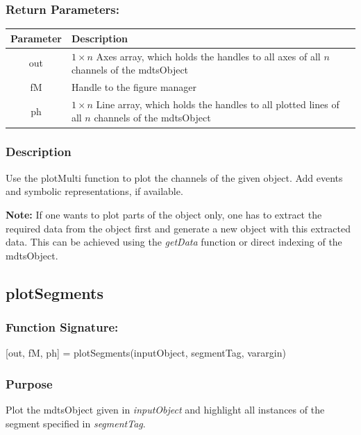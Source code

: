 \documentclass[a4]{scrreprt}
\begin{document}
\subsubsection{Return Parameters:}

\begin{longtabu} to \textwidth {|c|X|}
	\hline
	\textbf{Parameter} & \textbf{Description} \\ \hline
	\endhead
	out & $1 \times n$ Axes array, which holds the handles to all axes of all $n$ channels of the mdtsObject \\ \hline
	fM & Handle to the figure manager \\ \hline
	ph & $1 \times n$ Line array, which holds the handles to all plotted lines of all $n$ channels of the mdtsObject \\ \hline
\end{longtabu}

\subsubsection{Description}

Use the plotMulti function to plot the channels of the given object. Add events and symbolic representations, if available.

\textbf{Note:} If one wants to plot parts of the object only, one has to extract the required data from the object first and generate a new object with this extracted data. This can be achieved using the \textit{getData} function or direct indexing of the mdtsObject.

\subsection{plotSegments}

\subsubsection{Function Signature:}

\begin{center}
	[out, fM, ph] = plotSegments(inputObject, segmentTag, varargin)
\end{center}

\subsubsection{Purpose}

Plot the mdtsObject given in \textit{inputObject} and highlight all instances of the segment specified in \textit{segmentTag}.
\end{document}
